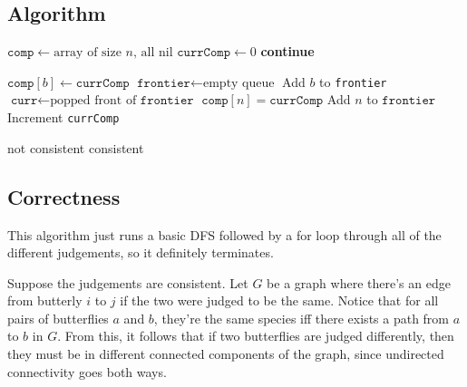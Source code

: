 \documentclass[12pt]{article}
\begin{document}
\subsection{Algorithm}

\begin{algorithmic}[1]
    \State $\texttt{comp} \gets \text{array of size }n\text{, all nil}$
    \State $\texttt{currComp} \gets 0$
            \State \textbf{continue}
        \EndIf

        \item[]
        \State $\texttt{comp}[b] \gets \texttt{currComp}$
        \State $\texttt{frontier} \gets \text{empty queue}$
        \State Add $b$ to \texttt{frontier}
            \State $\texttt{curr} \gets \text{popped front of }\texttt{frontier}$
                    \State $\texttt{comp}[n] = \texttt{currComp}$
                    \State Add $n$ to $\texttt{frontier}$
                \EndIf
            \EndFor
        \EndWhile
        \State Increment \texttt{currComp}
    \EndFor

    \item[]
                \State \Return not consistent
            \EndIf
        \EndFor
    \EndFor
    \State \Return consistent
\end{algorithmic}

\pagebreak

\subsection{Correctness}

This algorithm just runs a basic DFS followed
by a for loop through all of the different judgements,
so it definitely terminates.

Suppose the judgements are consistent.
Let $G$ be a graph where there's an edge from butterly $i$ to $j$ if
the two were judged to be the same.
Notice that for all pairs of butterflies $a$ and $b$, they're the same species
iff there exists a path from $a$ to $b$ in $G$.
From this, it follows that if two butterflies
are judged differently, then they must be in different connected
components of the graph, since undirected connectivity goes both ways.
\end{document}
